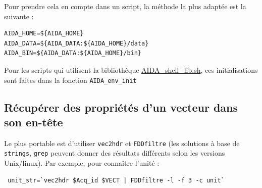    Pour prendre cela en compte dans un script, la méthode
la plus adaptée est la suivante :
\begin{verbatim}
AIDA_HOME=${AIDA_HOME}
AIDA_DATA=${AIDA_DATA:${AIDA_HOME}/data}
AIDA_BIN=${AIDA_DATA:${AIDA_HOME}/bin}
\end{verbatim}

   Pour les scripts qui utilisent la bibliothèque \url{AIDA_shell_lib.sh}, 
ces initialisations sont faites dans la fonction \texttt{AIDA\_env\_init}

\subsection{Récupérer des propriétés d'un vecteur dans son en-tête}
Le plus portable est d'utiliser \texttt{vec2hdr} et \texttt{FDDfiltre} 
(les solutions à base de \texttt{strings}, \texttt{grep} peuvent
donner des résultats différents selon les versions Unix/linux).
Par exemple, pour connaître l'unité : 
\begin{verbatim}
 unit_str=`vec2hdr $Acq_id $VECT | FDDfiltre -l -f 3 -c unit`
\end{verbatim}
